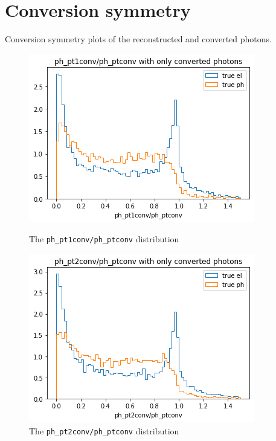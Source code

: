 \documentclass[a4paper, oneside, 11pt, openright]{book}
\begin{document}
	\chapter{Conversion symmetry} \label{Appex: sym}
		Conversion symmetry plots of the reconstructed and converted photons. %
		\begin{figure}[H]  
			\begin{minipage}[b]{0.5\linewidth}
				\centering
				\includegraphics[width=.9\linewidth]{tesi_images/pt1_pt.png} 
				\caption{The \texttt{ph\_pt1conv/ph\_ptconv} distribution} 
				\label{fig: pt1/pt}
				\vspace{4ex}
			\end{minipage}%
			\begin{minipage}[b]{0.5\linewidth}
				\centering
				\includegraphics[width=.9\linewidth]{tesi_images/pt2_pt.png} 
				\caption{The \texttt{ph\_pt2conv/ph\_ptconv} distribution}
				\label{fig: pt2/pt} 
				\vspace{4ex}
			\end{minipage}
		\end{figure} 
\end{document}
